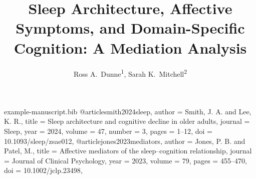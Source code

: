 
\begin{filecontents}{example-manuscript.bib}
@article{smith2024sleep,
  author  = {Smith, J. A. and Lee, K. R.},
  title   = {Sleep architecture and cognitive decline in older adults},
  journal = {Sleep},
  year    = {2024},
  volume  = {47},
  number  = {3},
  pages   = {1--12},
  doi     = {10.1093/sleep/zsae012},
}
@article{jones2023mediators,
  author  = {Jones, P. B. and Patel, M.},
  title   = {Affective mediators of the sleep--cognition relationship},
  journal = {Journal of Clinical Psychology},
  year    = {2023},
  volume  = {79},
  pages   = {455--470},
  doi     = {10.1002/jclp.23498},
}
\end{filecontents}

\documentclass[palette=lancet, journal={Sleep}]{rossmanuscript}


\title{Sleep Architecture, Affective Symptoms, and Domain-Specific
       Cognition: A Mediation Analysis}
\author{Ross A.\ Dunne\textsuperscript{1},
        Sarah K.\ Mitchell\textsuperscript{2}}



\maketitlepage

\structuredabstract
  {Poor sleep is associated with cognitive decline, yet the mediating role
   of affective symptoms remains unclear \autocite{smith2024sleep}.}
  {Community-dwelling older adults ($N = 312$, age 60--85) completed
   polysomnography, the DASS-21, and the RBANS. Parallel mediation models
   tested indirect effects of sleep architecture on five cognitive domains
   through depressive and anxiety symptoms.}
  {Slow-wave sleep percentage predicted delayed memory via depressive
   symptoms (\betacoef{-0.18}; \ci{-0.28}{-0.34}{-0.08}; \pval{0.002}).
   No significant indirect effect emerged through anxiety
   (\pval{0.41}).}
  {Depressive symptoms partially mediate the relationship between
   reduced slow-wave sleep and memory decline, suggesting a potential
   therapeutic target \autocite{jones2023mediators}.}

